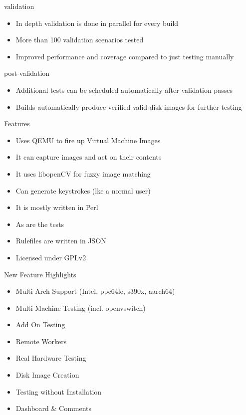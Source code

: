\documentclass{beamer}
\begin{document}
    \begin{frame}{validation}
        \begin{itemize}
            \item In depth validation is done in parallel for every build
            \item More than 100 validation scenarios tested
            \item Improved performance and coverage compared to just testing manually
        \end{itemize}
    \end{frame}

    \begin{frame}{post-validation}
        \begin{itemize}
            \item Additional tests can be scheduled automatically after validation passes
            \item Builds automatically produce verified valid disk images for further testing
        \end{itemize}
    \end{frame}

    \begin{frame}{Features}
        \begin{itemize}
            \item Uses QEMU to fire up Virtual Machine Images
            \item It can capture images and act on their contents
            \item It uses libopenCV for fuzzy image matching
            \item Can generate keystrokes (lke a normal user)
            \item It is mostly written in Perl
            \item As are the tests
            \item Rulefiles are written in JSON
            \item Licensed under GPLv2
        \end{itemize}
    \end{frame}

    \begin{frame}{New Feature Highlights}
        \begin{itemize}
            \item Multi Arch Support (Intel, ppc64le, s390x, aarch64)
            \item Multi Machine Testing (incl. openvswitch)
            \item Add On Testing
            \item Remote Workers
            \item Real Hardware Testing
            \item Disk Image Creation
            \item Testing without Installation
            \item Dashboard \& Comments
        \end{itemize}
    \end{frame}
\end{document}
